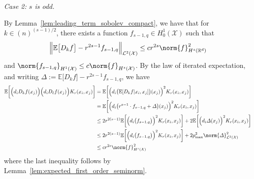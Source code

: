 \documentclass{article}
\newcommand{\Reals}{\mathbb{R}}
\newcommand{\1}{\mathbf{1}}
\newcommand{\Rd}{\Reals^d}
\newcommand{\Xset}{\mathcal{X}}
\newcommand{\Leb}{\mathcal{L}}
\newcommand{\Ebb}{\mathbb{E}}
\theoremstyle{alden}
\theoremstyle{aldenthm}
\theoremstyle{definition}
\theoremstyle{remark}
\begin{document}
\textit{Case 2: $s$ is odd.}

By Lemma~\ref{lem:leading_term_sobolev_compact}, we have that for $k \in (n)^{(s - 1)/2}$, there exists a function $f_{s - 1,q} \in H_0^1(\Xset)$ such that
\begin{equation*}
\Bigl\|\Ebb\bigl[D_kf\bigr] - r^{2{s - 1}}f_{s - 1,q}\Bigr\|_{\Leb^2(\Xset)} \leq c r^{2s} \norm{f}_{H^s(\Rd)}^2
\end{equation*}
and $\norm{f_{s - 1,q}}_{H^1(\Xset)} \leq c \norm{f}_{H^s(\Xset)}$. By the law of iterated expectation, and writing $\varDelta := \Ebb\bigl[D_kf\bigr] - r^{2{s - 1}}f_{s - 1,q}$, we have
\begin{align*}
\Ebb\biggl[\Bigl(d_iD_kf(x_j)\Bigr) \Bigl(d_iD_{\ell}f(x_j)\Bigr) K_r(x_i,x_j)\biggr] & =  \Ebb\biggl[\Bigl(d_i\bigl(\Ebb[D_kf|x_i,x_j]\bigr)(x_j)\Bigr)^2K_r(x_i,x_j)\biggr] \nonumber \\
& = \Ebb\biggl[\Bigl(d_i\bigl(r^{s - 1}\cdot f_{s - 1,q} + \varDelta \bigr)(x_j)\Bigr)^2K_r(x_i,x_j)\biggr] \\
& \leq 2r^{2(s - 1)}\Ebb\biggl[\Bigl(d_i\bigl(f_{s - 1,q}\bigr)\Bigr)^2K_r(x_i,x_j)\biggr]  + 2 \Ebb \biggl[\Bigl(d_i\varDelta(x_j)\Bigr)^2K_r(x_i,x_j)\biggr] \\
& \leq 2r^{2(s - 1)}\Ebb\biggl[\Bigl(d_i\bigl(f_{s - 1,q}\bigr)\Bigr)^2K_r(x_i,x_j)\biggr] + 2p_{\max}^2\norm{\varDelta}_{\Leb^2(\Xset)}^2 \\
& \leq c r^{2s} \norm{f}_{H^s(\Xset)}^2
\end{align*}
where the last inequality follows by Lemma~\ref{lem:expected_first_order_seminorm}.
\end{document}
